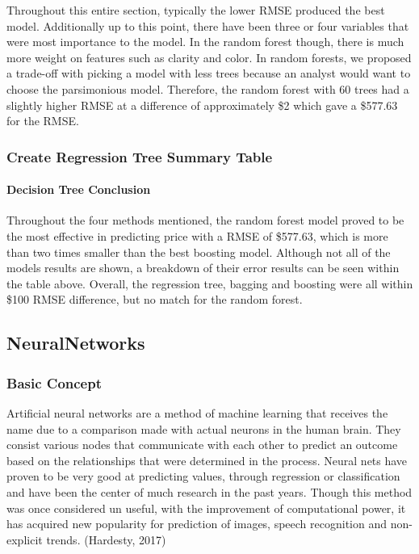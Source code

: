 \documentclass[
  paper=a4,
  ,captions=tableheading
]{scrartcl}
\begin{document}
Throughout this entire section, typically the lower RMSE produced the
best model. Additionally up to this point, there have been three or four
variables that were most importance to the model. In the random forest
though, there is much more weight on features such as clarity and color.
In random forests, we proposed a trade-off with picking a model with
less trees because an analyst would want to choose the parsimonious
model. Therefore, the random forest with 60 trees had a slightly higher
RMSE at a difference of approximately \$2 which gave a \$577.63 for the
RMSE.

\hypertarget{create-regression-tree-summary-table}{%
\subsubsection{Create Regression Tree Summary
Table}\label{create-regression-tree-summary-table}}

\hypertarget{decision-tree-conclusion}{%
\paragraph{Decision Tree Conclusion}\label{decision-tree-conclusion}}

Throughout the four methods mentioned, the random forest model proved to
be the most effective in predicting price with a RMSE of \$577.63, which
is more than two times smaller than the best boosting model. Although
not all of the models results are shown, a breakdown of their error
results can be seen within the table above. Overall, the regression
tree, bagging and boosting were all within \$100 RMSE difference, but no
match for the random forest.

\hypertarget{neuralnetworks}{%
\subsection{NeuralNetworks}\label{neuralnetworks}}

\hypertarget{basic-concept}{%
\subsubsection{Basic Concept}\label{basic-concept}}

Artificial neural networks are a method of machine learning that
receives the name due to a comparison made with actual neurons in the
human brain. They consist various nodes that communicate with each other
to predict an outcome based on the relationships that were determined in
the process. Neural nets have proven to be very good at predicting
values, through regression or classification and have been the center of
much research in the past years. Though this method was once considered
un useful, with the improvement of computational power, it has acquired
new popularity for prediction of images, speech recognition and
non-explicit trends. (Hardesty, 2017)
\end{document}
